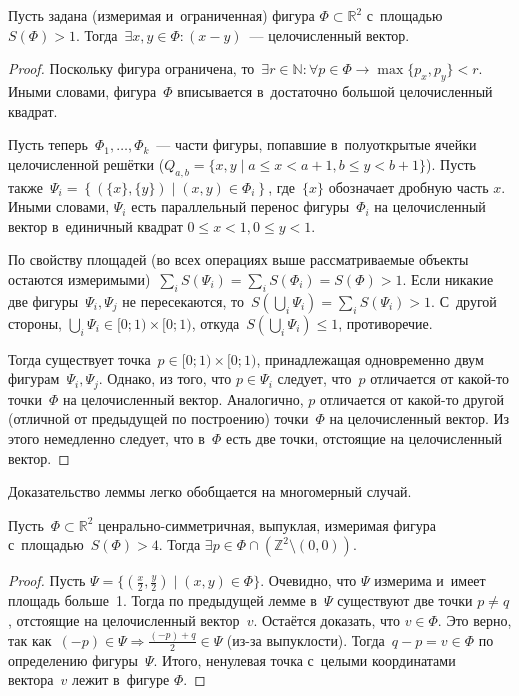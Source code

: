 \documentclass{article}
\begin{document}
\begin{lemma}
  Пусть задана (измеримая и~ограниченная) фигура $\Phi \subset \mathbb{R}^2$
  с~площадью $S(\Phi)>1$. Тогда~$\exists x, y \in \Phi\colon (x - y)$~---
  целочисленный вектор.
\end{lemma}
\begin{proof}
  Поскольку фигура ограничена, то~$\exists r \in \mathbb{N}\colon \forall p \in
  \Phi \rightarrow \max\{p_x, p_y\} < r$. Иными словами, фигура~$\Phi$
  вписывается в~достаточно большой целочисленный квадрат.

  Пусть теперь~$\Phi_1, \ldots, \Phi_k$~--- части фигуры, попавшие
  в~полуоткрытые ячейки целочисленной решётки ($Q_{a,b} = \{ x, y \mid a \le x
  < a + 1, b \le y < b + 1\}$). Пусть также~$\Psi_i = \left\{ (\{x\}, \{y\})
  \mid (x, y) \in \Phi_i \right\}$, где~$\{x\}$ обозначает дробную часть $x$.
  Иными словами, $\Psi_i$ есть параллельный перенос фигуры~$\Phi_i$ на
  целочисленный вектор в~единичный квадрат $0 \le x < 1, 0 \le y < 1$.

  По свойству площадей (во всех операциях выше рассматриваемые объекты остаются
  измеримыми)~$\sum_i S(\Psi_i) = \sum_i S(\Phi_i) = S(\Phi) > 1$. Если никакие
  две фигуры~$\Psi_i, \Psi_j$ не пересекаются, то~$S(\bigcup_i \Psi_i) =
  \sum_i S(\Psi_i) > 1$. С~другой стороны, $\bigcup_i \Psi_i \in [0; 1) \times
  [0; 1)$, откуда~$S(\bigcup_i \Psi_i) \le 1$, противоречие.

  Тогда существует точка~$p \in [0; 1) \times [0; 1)$, принадлежащая
  одновременно двум фигурам~$\Psi_i, \Psi_j$. Однако, из того, что $p \in
  \Psi_i$ следует, что~$p$ отличается от какой-то точки~$\Phi$ на целочисленный
  вектор. Аналогично, $p$ отличается от какой-то другой (отличной от предыдущей
  по построению) точки~$\Phi$ на целочисленный вектор. Из этого немедленно
  следует, что в~$\Phi$ есть две точки, отстоящие на целочисленный вектор.
\end{proof}
\begin{remark}
  Доказательство леммы легко обобщается на многомерный случай.
\end{remark}

\begin{lemma}
  Пусть~$\Phi \subset \mathbb{R}^2$ ценрально-симметричная, выпуклая, измеримая
  фигура с~площадью~$S(\Phi) > 4$. Тогда $\exists p \in \Phi \cap (\mathbb{Z}^2
  \setminus (0, 0))$.
\end{lemma}
\begin{proof}
  Пусть $\Psi = \{ (\frac{x}{2}, \frac{y}{2}) \mid (x, y) \in \Phi \}$.
  Очевидно, что $\Psi$ измерима и~имеет площадь больше~1. Тогда по предыдущей
  лемме в~$\Psi$ существуют две точки $p \ne q$, отстоящие на целочисленный
  вектор~$v$. Остаётся доказать, что $v \in \Phi$. Это верно, так как~$(-p) \in
  \Psi \Rightarrow \frac{(-p) + q}{2} \in \Psi$ (из-за выпуклости). Тогда~$q -
  p = v \in \Phi$ по определению фигуры~$\Psi$. Итого, ненулевая точка с~целыми
  координатами вектора~$v$ лежит в~фигуре $\Phi$.
\end{proof}
\end{document}
